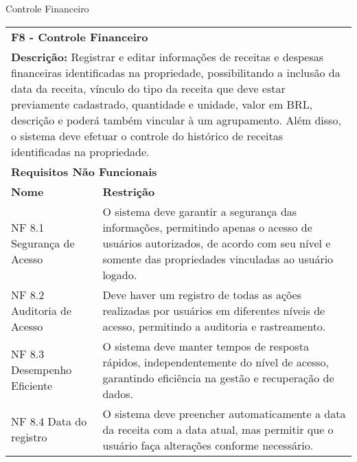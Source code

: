 \begin{tabframed}[htb]
  \caption{Controle Financeiro}
  \label{quad:requisitoControleFinanceiro}
  \renewcommand{\arraystretch}{1.5}
  \begin{tabular}{|l|l|}
    \cline{1-2}
    \multicolumn{2}{|l|}{\textbf{F8 - Controle Financeiro}}
    \\ \cline{1-2}

    \multicolumn{2}{|p{15cm}|}{
    \raggedright \textbf{Descrição:} Registrar e editar informações de receitas e despesas financeiras identificadas na propriedade, possibilitando a inclusão da data da receita, vínculo do tipo da receita que deve estar previamente cadastrado, quantidade e unidade, valor em \gls{BRL}, descrição e poderá também vincular à um agrupamento. Além disso, o sistema deve efetuar o controle do histórico de receitas identificadas na propriedade.
    }
    \\ \cline{1-2}

    \multicolumn{2}{|l|}{\textbf{Requisitos Não Funcionais}}
    \\ \cline{1-2}

    \textbf{Nome}                   &
    \textbf{Restrição}
    \\ \cline{1-2}

    NF 8.1 Segurança de Acesso      &
    \multicolumn{1}{|p{8cm}|}{\raggedright O sistema deve garantir a segurança das informações, permitindo apenas o acesso de usuários autorizados, de acordo com seu nível e somente das propriedades vinculadas ao usuário logado.}
    \\ \cline{1-2}

    NF 8.2 Auditoria de Acesso      &
    \multicolumn{1}{|p{8cm}|}{\raggedright Deve haver um registro de todas as ações realizadas por usuários em diferentes níveis de acesso, permitindo a auditoria e rastreamento.}
    \\ \cline{1-2}

    NF 8.3 Desempenho Eficiente     &
    \multicolumn{1}{|p{8cm}|}{\raggedright O sistema deve manter tempos de resposta rápidos, independentemente do nível de acesso, garantindo eficiência na gestão e recuperação de dados.}
    \\ \cline{1-2}

    NF 8.4 Data do registro         &
    \multicolumn{1}{|p{8cm}|}{\raggedright
    O sistema deve preencher automaticamente a data da receita com a data atual, mas permitir que o usuário faça alterações conforme necessário.}
    \\ \cline{1-2}


\end{tabular}
\end{tabframed}
